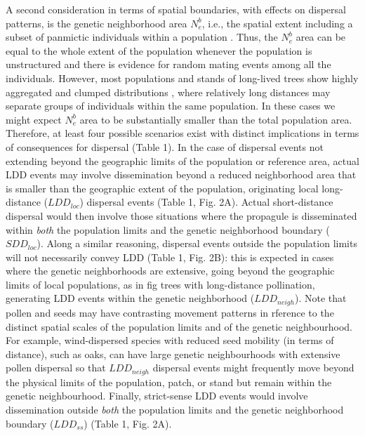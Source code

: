 \documentclass[a4paper, 12pt]{article}
\begin{document}
\begin{linenumbers}
A second consideration in terms of spatial boundaries, with effects on dispersal patterns, is the genetic neighborhood area $N^b_e$, i.e., the spatial extent including a subset of panmictic individuals within a population \citep{Wright:1943aa,Wright:1946aa}. Thus, the $N^b_e$ area can be equal to the whole extent of the population whenever the population is unstructured and there is evidence for random mating events among all the individuals. However, most populations and stands of long-lived trees show highly aggregated and clumped distributions \citep{Seidler:2006hx}, where relatively long distances may separate groups of individuals within the same population. In these cases we might expect $N^b_e$ area to be substantially smaller than the total population area. Therefore, at least four possible scenarios exist with distinct implications in terms of consequences for dispersal (Table 1). In the case of dispersal events not extending beyond the geographic limits of the population or reference area, actual LDD events may involve dissemination beyond a reduced neighborhood area that is smaller than the geographic extent of the population, originating local long-distance ($LDD_{loc}$) dispersal events (Table 1, Fig. 2A). Actual short-distance dispersal would then involve those situations where the propagule is disseminated within \textit{both} the population limits and the genetic neighborhood boundary ($SDD_{loc}$). Along a similar reasoning, dispersal events outside the population limits will not necessarily convey LDD (Table 1, Fig. 2B): this is expected in cases where the genetic neighborhoods are extensive, going beyond the geographic limits of local populations, as in fig trees \citep{Nason:1998aa} with long-distance pollination, generating LDD events within the genetic neighborhood ($LDD_{neigh}$). Note that pollen and seeds may have contrasting movement patterns in rference to the distinct spatial scales of the population limits and of the genetic neighbourhood. For example, wind-dispersed species with reduced seed mobility (in terms of distance), such as oaks, can have large genetic neighbourhoods with extensive pollen dispersal \citep{Streiff99} \citep[but see, e.g.,][for fragmented stands]{Smouse:2001aa,Dutech:2005fk} so that $LDD_{neigh}$ dispersal events might frequently move beyond the physical limits of the population, patch, or stand but remain within the genetic neighbourhood. Finally, strict-sense LDD events would involve dissemination outside \textit{both} the population limits and the genetic neighborhood boundary ($LDD_{ss}$) (Table 1, Fig. 2A).


\end{linenumbers}
\end{document}
